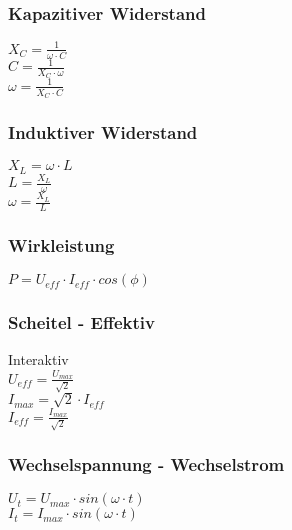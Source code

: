 \subsubsection{Kapazitiver Widerstand} 
\begin{minipage}{0.45\textwidth} 
$ X_{C} = \frac{ 1}{\omega \cdot C} $\\ 
$ C = \frac{ 1}{X_{C} \cdot \omega } $\\ 
$ \omega = \frac{ 1}{X_{C} \cdot C} $\\ 
\end{minipage} 
\begin{minipage}{0.45\textwidth} 
 
\end{minipage} 
\subsubsection{Induktiver Widerstand} 
\begin{minipage}{0.45\textwidth} 
$ X_{L} =\omega \cdot L $\\ 
$ L = \frac{X_{L} }{\omega } $\\ 
$ \omega =\frac{X_{L} }{L} $\\ 
\end{minipage} 
\begin{minipage}{0.45\textwidth} 
 
\end{minipage} 
\subsubsection{Wirkleistung} 
\begin{minipage}{0.45\textwidth} 
$ P = U_{eff}\cdot I_{eff}\cdot cos(\phi ) $\\ 
\end{minipage} 
\begin{minipage}{0.45\textwidth} 
 
\end{minipage} 
\subsubsection{Scheitel - Effektiv} 
\begin{minipage}{0.45\textwidth} 
Interaktiv\\ 
$ U_{eff}  = \frac{U_{max} }{\sqrt{2}} $\\ 
$ I_{max}  = \sqrt{2}\cdot I_{eff} $\\ 
$ I_{eff}  = \frac{I_{max} }{\sqrt{2}} $\\ 
\end{minipage} 
\begin{minipage}{0.45\textwidth} 
 
\end{minipage} 
\subsubsection{Wechselspannung - Wechselstrom} 
\begin{minipage}{0.45\textwidth} 
$ U_{t}  = U_{max} \cdot sin(\omega \cdot t) $\\ 
$ I_{t}  = I_{max} \cdot sin(\omega \cdot t) $\\ 
\end{minipage} 
\begin{minipage}{0.45\textwidth} 
 
\end{minipage} 

